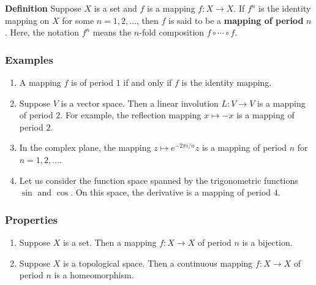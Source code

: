 \documentclass[12pt]{article}
\begin{document}

{\bf Definition}
Suppose $X$ is a set and $f$ is a mapping $f:X\to X$. 
If  $f^n$ is the identity mapping on $X$ for some $n=1,2,\ldots$, then 
$f$ is said to be a {\bf mapping of period} $n$.
Here, the notation $f^n$ means the $n$-fold 
composition $f\circ\cdots \circ f$.


\subsubsection{Examples}
\begin{enumerate}
\item A mapping $f$ is of period $1$ if and only if $f$ is the identity 
mapping.
\item Suppose $V$ is a vector space. Then a linear involution $L:V\to V$ is 
a mapping of period $2$.
For example, the reflection mapping $x\mapsto -x$ is a mapping of period $2$.
\item In the complex plane, the mapping $z\mapsto e^{-2\pi i/n}z $ is a 
mapping of period $n$ for $n=1,2,\ldots$. 
\item Let us consider the  function space spanned by the 
trigonometric functions $\sin$ and $\cos$. On this space,
the derivative is a mapping of period $4$. 
\end{enumerate}


\subsubsection{Properties}
\begin{enumerate}
\item  Suppose $X$ is a set. 
Then a mapping $f:X\to X$ of period $n$ is  a bijection. 

\item Suppose $X$ is a topological space. 
Then a continuous mapping $f:X\to X$ of period $n$ is  a homeomorphism. 
\end{enumerate}
\end{document}
